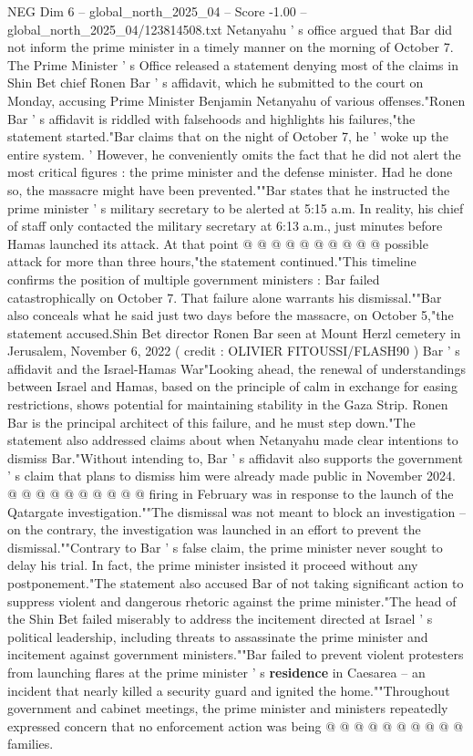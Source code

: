 \begin{textsample}{NEG Dim 6 – global\_north\_2025\_04 – Score -1.00 – global\_north\_2025\_04/123814508.txt}  \label{ex:f6_neg_265}
Netanyahu ' s office argued that Bar did not inform the prime minister in a timely manner on the morning of October 7.
The Prime Minister ' s Office released a statement denying most of the claims in Shin Bet chief Ronen Bar ' s affidavit, which he submitted to the court on Monday, accusing Prime Minister Benjamin Netanyahu of various offenses."Ronen Bar ' s affidavit is riddled with falsehoods and highlights his failures,"the statement started."Bar claims that on the night of October 7, he ' woke up the entire system. ' However, he conveniently omits the fact that he did not alert the most critical figures : the prime minister and the defense minister.
Had he done so, the massacre might have been prevented.""Bar states that he instructed the prime minister ' s military secretary to be alerted at 5:15 a.m.
In reality, his chief of staff only contacted the military secretary at 6:13 a.m., just minutes before Hamas launched its attack.
At that point @ @ @ @ @ @ @ @ @ @ possible attack for more than three hours,"the statement continued."This timeline confirms the position of multiple government ministers : Bar failed catastrophically on October 7.
That failure alone warrants his dismissal.""Bar also conceals what he said just two days before the massacre, on October 5,"the statement accused.Shin Bet director Ronen Bar seen at Mount Herzl cemetery in Jerusalem, November 6, 2022 ( credit : OLIVIER FITOUSSI/FLASH90 ) Bar ' s affidavit and the Israel-Hamas War"Looking ahead, the renewal of understandings between Israel and Hamas, based on the principle of calm in exchange for easing restrictions, shows potential for maintaining stability in the Gaza Strip.
Ronen Bar is the principal architect of this failure, and he must step down."The statement also addressed claims about when Netanyahu made clear intentions to dismiss Bar."Without intending to, Bar ' s affidavit also supports the government ' s claim that plans to dismiss him were already made public in November 2024. @ @ @ @ @ @ @ @ @ @ firing in February was in response to the launch of the Qatargate investigation.""The dismissal was not meant to block an investigation -- on the contrary, the investigation was launched in an effort to prevent the dismissal.""Contrary to Bar ' s false claim, the prime minister never sought to delay his trial.
In fact, the prime minister insisted it proceed without any postponement."The statement also accused Bar of not taking significant action to suppress violent and dangerous rhetoric against the prime minister."The head of the Shin Bet failed miserably to address the incitement directed at Israel ' s political leadership, including threats to assassinate the prime minister and incitement against government ministers.""Bar failed to prevent violent protesters from launching flares at the prime minister ' s \textbf{residence} in Caesarea -- an incident that nearly killed a security guard and ignited the home.""Throughout government and cabinet meetings, the prime minister and ministers repeatedly expressed concern that no enforcement action was being @ @ @ @ @ @ @ @ @ @ families.

\end{textsample}
